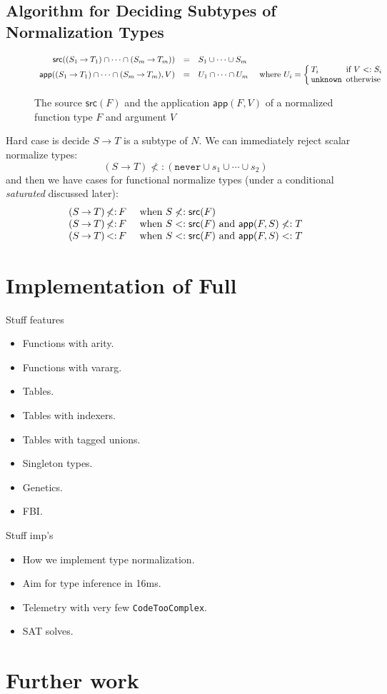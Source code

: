 \documentclass[acmsmall,review,screen]{acmart}
\newcommand{\NEVER}{\mathtt{never}}
\newcommand{\UNKNOWN}{\mathtt{unknown}}
\newcommand{\APP}{\mathsf{app}}
\newcommand{\SRC}{\mathsf{src}}
\newcommand{\fun}{\mathbin{\rightarrow}}
\begin{document}
\subsection{Algorithm for Deciding Subtypes of Normalization Types}
\label{subsec:algth}

\begin{figure}
  
\[\begin{array}{rcll}
  \SRC((S_1 \fun T_1) \cap\cdots\cap (S_m \fun T_m)) & = & S_1 \cup\cdots\cup S_m \\
  \APP((S_1 \fun T_1) \cap\cdots\cap (S_m \fun T_m), V) & = & U_1 \cap\cdots\cap U_m &
  \mbox{ where } U_i = \left\{ \begin{array}{@{\,}l@{\,}l}
    T_i & \mbox{ if } V <: S_i \\
    \UNKNOWN & \mbox{ otherwise }
  \end{array} \right.
\end{array}\]
\caption{The source $\SRC(F)$
  and the application $\APP(F, V)$ of a normalized function type $F$ and argument $V$}
\label{fig:ntypes}

\end{figure}

Hard case is decide $S \fun T$ is a subtype of $N$.
We can immediately reject scalar normalize types:
\[
  (S \fun T) \not<: (\NEVER \cup s_1 \cup\cdots\cup s_2)
\]
and then we have cases for functional normalize types (under a conditional \emph{saturated} discussed later):
\[\begin{array}{r@{\,}c@{\,}ll}
  (S \fun T) & \not<: & F & \mbox{ when } S \not<: \SRC(F) \\
  (S \fun T) & \not<: & F & \mbox{ when } S <: \SRC(F) \mbox{ and } \APP(F, S) \not<: T \\
  (S \fun T) & <: & F & \mbox{ when } S <: \SRC(F) \mbox{ and } \APP(F, S) <: T
\end{array}\]


\section{Implementation of Full }

Stuff features
\begin{itemize}
\item Functions with arity.
\item Functions with vararg.
\item Tables.
\item Tables with indexers.
\item Tables with tagged unions.
\item Singleton types.
\item Genetics.
\item FBI.
\end{itemize}
Stuff imp's
\begin{itemize}
\item How we implement type normalization.
\item Aim for type inference in 16ms.
\item Telemetry with very few \verb|CodeTooComplex|.
\item SAT solves.
\end{itemize}

\section{Further work}



\end{document}
